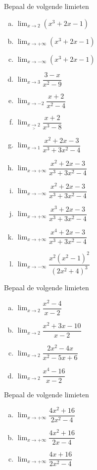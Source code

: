 \documentclass[12pt,twoside,a4paper]{article}
\begin{document}
\begin{oefening}
  Bepaal de volgende limieten
  \begin{multicols}{3}
  \begin{enumerate}[(a)]
  \itemsep1em
  \item $\displaystyle\lim_{x\to 2}\left(x^3+2x-1\right)$
  \item $\displaystyle\lim_{x\to +\infty}\left(x^3+2x-1\right)$
  \item $\displaystyle\lim_{x\to -\infty}\left(x^3+2x-1\right)$
  \item $\displaystyle\lim_{x\to 3}\dfrac{3-x}{x^2-9}$
  \item $\displaystyle\lim_{x\to -2}\dfrac{x+2}{x^2-4}$
  \item $\displaystyle\lim_{x\underset{>}{\to} 2}\dfrac{x+2}{x^3-8}$
  \item $\displaystyle\lim_{x\to 1}\dfrac{x^2+2x-3}{x^3+3x^2-4}$
  \item $\displaystyle\lim_{x\to +\infty}\dfrac{x^2+2x-3}{x^3+3x^2-4}$
  \item $\displaystyle\lim_{x\to -\infty}\dfrac{x^2+2x-3}{x^3+3x^2-4}$
  \item $\displaystyle\lim_{x\to +\infty}\dfrac{x^3+2x-3}{x^3+3x^2-4}$
  \item $\displaystyle\lim_{x\to +\infty}\dfrac{x^4+2x-3}{x^3+3x^2-4}$
  \item $\displaystyle\lim_{x\to -\infty}\dfrac{x^2(x^2-1)^2}{(2x^2+4)^3}$
  \end{enumerate}
  \end{multicols}
\end{oefening}

\begin{oefening}
  Bepaal de volgende limieten
  \begin{multicols}{2}
  \begin{enumerate}[(a)]
  \itemsep1em
  \item $\displaystyle\lim_{x\to 2}\dfrac{x^2-4}{x-2}$
  \item $\displaystyle\lim_{x\to 2}\dfrac{x^2+3x-10}{x-2}$
  \item $\displaystyle\lim_{x\to 2}\dfrac{2x^2-4x}{x^2-5x+6}$
  \item $\displaystyle\lim_{x\to 2}\dfrac{x^4-16}{x-2}$
  \end{enumerate}
  \end{multicols}
\end{oefening}

\begin{oefening}
  Bepaal de volgende limieten
  \begin{multicols}{3}
  \begin{enumerate}[(a)]
  \itemsep1em
  \item $\displaystyle\lim_{x\to +\infty}\dfrac{4x^2+16}{2x^2-4}$
  \item $\displaystyle\lim_{x\to +\infty}\dfrac{4x^2+16}{2x-4}$
  \item $\displaystyle\lim_{x\to +\infty}\dfrac{4x+16}{2x^2-4}$
  \end{enumerate}
  \end{multicols}
\end{oefening}
\end{document}
